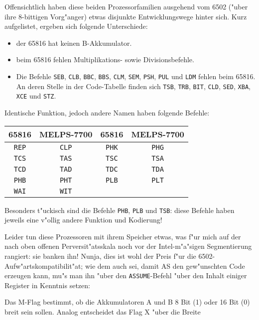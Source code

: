 \documentclass[12pt,a4paper,twoside]{report}
\newcommand{\tty}[1]{{\tt #1}}
\begin{document}
{Offensichtlich haben diese beiden Prozessorfamilien ausgehend vom
6502 ("uber ihre 8-bittigen Vorg"anger) etwas disjunkte Entwicklungswege
hinter sich.  Kurz aufgelistet, ergeben sich folgende Unterschiede:
\begin{itemize}
\item{der 65816 hat keinen B-Akkumulator.}
\item{beim 65816 fehlen Multiplikations- sowie Divisionsbefehle.}
\item{Die Befehle \tty{SEB}, \tty{CLB}, \tty{BBC}, \tty{BBS},
      \tty{CLM}, \tty{SEM}, \tty{PSH}, \tty{PUL} und \tty{LDM}
      fehlen beim 65816.  An deren Stelle in der Code-Tabelle finden
      sich \tty{TSB}, \tty{TRB}, \tty{BIT}, \tty{CLD}, \tty{SED},
      \tty{XBA}, \tty{XCE} und \tty{STZ}.}
\end{itemize}
Identische Funktion, jedoch andere Namen haben folgende Befehle:
\par
\begin{center}\begin{tabular}{|c|c||c|c|}
\hline
   65816  &  MELPS-7700 & 65816 & MELPS-7700 \\
\hline
\hline
    \tty{REP}   &    \tty{CLP}      & \tty{PHK}   &   \tty{PHG} \\
    \tty{TCS}   &    \tty{TAS}      & \tty{TSC}   &   \tty{TSA} \\
    \tty{TCD}   &    \tty{TAD}      & \tty{TDC}   &   \tty{TDA} \\
    \tty{PHB}   &    \tty{PHT}      & \tty{PLB}   &   \tty{PLT} \\
    \tty{WAI}   &    \tty{WIT}      &       &       \\
\hline
\end{tabular}\end{center}
\par
Besonders t"uckisch sind die Befehle \tty{PHB}, \tty{PLB} und \tty{TSB}:
diese Befehle haben jeweils eine v"ollig andere Funktion und Kodierung!
\par
Leider tun diese Prozessoren mit ihrem Speicher etwas, was f"ur mich
auf der nach oben offenen Perversit"atsskala noch vor der
Intel-m"a"sigen Segmentierung rangiert: sie banken ihn!
Nunja, dies ist wohl der Preis f"ur die 6502-Aufw"artskompatibilit"at;
wie dem auch sei, damit AS den gew"unschten Code erzeugen kann, mu"s
man ihn "uber den \tty{ASSUME}-Befehl "uber den Inhalt einiger
Register in Kenntnis setzen:
\par
Das M-Flag bestimmt, ob die Akkumulatoren A und B 8 Bit (1) oder 16 Bit
(0) breit sein sollen.  Analog entscheidet das Flag X "uber die Breite
}
\end{document}
